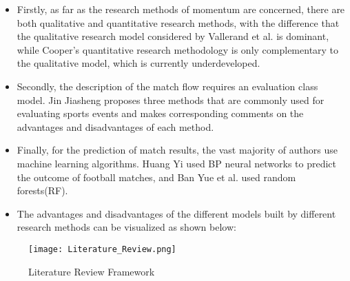 \documentclass[12pt]{article}  %
\begin{document}
\begin{itemize}
\setlength{\parsep}{0ex} %
\setlength{\topsep}{2ex} %
\setlength{\itemsep}{1ex} %
\item Firstly, as far as the research methods of momentum are concerned, there are both qualitative and quantitative research methods, with the difference that the qualitative research model considered by Vallerand et al. is dominant\cite{3}\cite{4}\cite{5}, while Cooper's quantitative research methodology is only complementary to the qualitative model, which is currently underdeveloped\cite{6}.

\item Secondly, the description of the match flow requires an evaluation class model. Jin Jiasheng proposes three methods that are commonly used for evaluating sports events and makes corresponding comments on the advantages and disadvantages of each method\cite{7}.

\item Finally, for the prediction of match results, the vast majority of authors use machine learning algorithms\cite{8}. Huang Yi used BP neural networks to predict the outcome of football matches\cite{9}, and Ban Yue et al. used random forests(RF)\cite{10}.

\item The advantages and disadvantages of the different models built by different research methods can be visualized as shown below:
\end{itemize}

\begin{figure}[htbp]  %
\centering  %
\texttt{[image: Literature\_Review.png]} %
\caption{Literature Review Framework} %
\end{figure}
\end{document}
